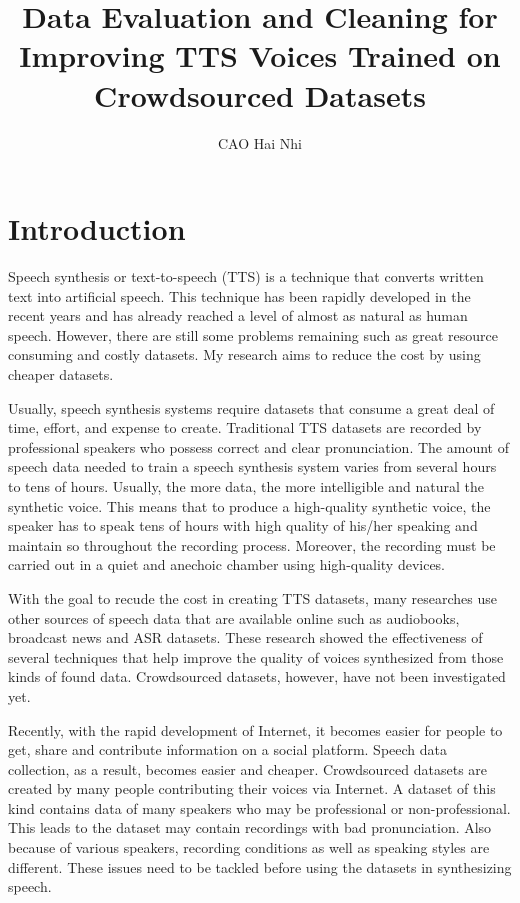 \documentclass[12pt]{article}
\title{Data Evaluation and Cleaning for Improving TTS Voices Trained on Crowdsourced Datasets}
\author{CAO Hai Nhi}
\begin{document}
\titlepage
\cmemberspage
\firstabstract
%
%
\toc
\newpage
\listoffigures

\listoftables
%
%
\newpage


\section{Introduction}
Speech synthesis or text-to-speech (TTS) is a technique that converts written text into artificial speech. This technique has been rapidly developed in the recent years and has already reached a level of almost as natural as human speech. However, there are still some problems remaining such as great resource consuming and costly datasets. My research aims to reduce the cost by using cheaper datasets.

Usually, speech synthesis systems require datasets that consume a great deal of time, effort, and expense to create. Traditional TTS datasets are recorded by professional speakers who possess correct and clear pronunciation. The amount of speech data needed to train a speech synthesis system varies from several hours to tens of hours. Usually, the more data, the more intelligible and natural the synthetic voice. This means that to produce a high-quality synthetic voice, the speaker has to speak tens of hours with high quality of his/her speaking and maintain so throughout the recording process. Moreover, the recording must be carried out in a quiet and anechoic chamber using high-quality devices.

With the goal to recude the cost in creating TTS datasets, many researches use other sources of speech data that are available online such as audiobooks, broadcast news and ASR datasets. These research showed the effectiveness of several techniques that help improve the quality of voices synthesized from those kinds of found data. Crowdsourced datasets, however, have not been investigated yet.

Recently, with the rapid development of Internet, it becomes easier for people to get, share and contribute information on a social platform. Speech data collection, as a result, becomes easier and cheaper. Crowdsourced datasets are created by many people contributing their voices via Internet. A dataset of this kind contains data of many speakers who may be professional or non-professional. This leads to the dataset may contain recordings with bad pronunciation. Also because of various speakers, recording conditions as well as speaking styles are different. These issues need to be tackled before using the datasets in synthesizing speech.
\end{document}
